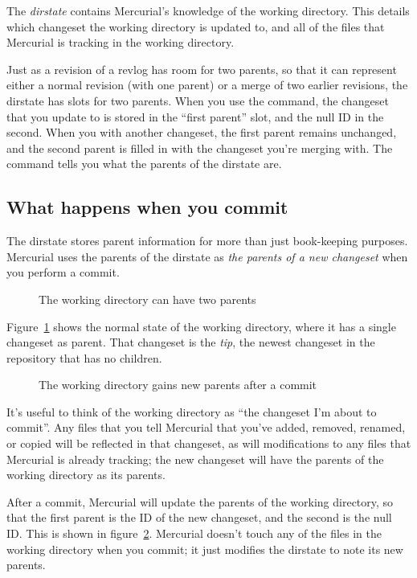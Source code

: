 The \emph{dirstate} contains Mercurial's knowledge of the working
directory.  This details which changeset the working directory is
updated to, and all of the files that Mercurial is tracking in the
working directory.

Just as a revision of a revlog has room for two parents, so that it
can represent either a normal revision (with one parent) or a merge of
two earlier revisions, the dirstate has slots for two parents.  When
you use the  command, the changeset that you update to
is stored in the ``first parent'' slot, and the null ID in the second.
When you  with another changeset, the first parent
remains unchanged, and the second parent is filled in with the
changeset you're merging with.  The  command tells you
what the parents of the dirstate are.

\subsection{What happens when you commit}

The dirstate stores parent information for more than just book-keeping
purposes.  Mercurial uses the parents of the dirstate as \emph{the
  parents of a new changeset} when you perform a commit.

\begin{figure}[ht]
  \centering
  \caption{The working directory can have two parents}
  \label{fig:concepts:wdir}
\end{figure}

Figure~\ref{fig:concepts:wdir} shows the normal state of the working
directory, where it has a single changeset as parent.  That changeset
is the \emph{tip}, the newest changeset in the repository that has no
children.

\begin{figure}[ht]
  \centering
  \caption{The working directory gains new parents after a commit}
  \label{fig:concepts:wdir-after-commit}
\end{figure}

It's useful to think of the working directory as ``the changeset I'm
about to commit''.  Any files that you tell Mercurial that you've
added, removed, renamed, or copied will be reflected in that
changeset, as will modifications to any files that Mercurial is
already tracking; the new changeset will have the parents of the
working directory as its parents.

After a commit, Mercurial will update the parents of the working
directory, so that the first parent is the ID of the new changeset,
and the second is the null ID.  This is shown in
figure~\ref{fig:concepts:wdir-after-commit}.  Mercurial doesn't touch
any of the files in the working directory when you commit; it just
modifies the dirstate to note its new parents.

